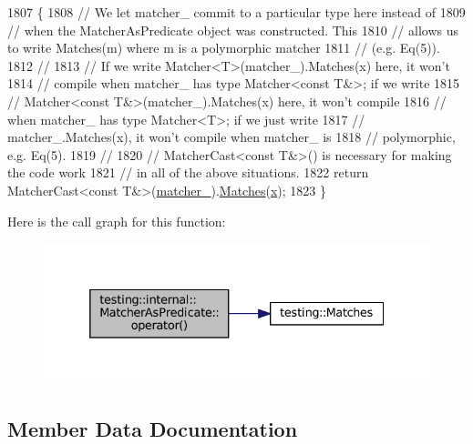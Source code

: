 \begin{DoxyCode}
1807                                     \{
1808     \textcolor{comment}{// We let matcher\_ commit to a particular type here instead of}
1809     \textcolor{comment}{// when the MatcherAsPredicate object was constructed.  This}
1810     \textcolor{comment}{// allows us to write Matches(m) where m is a polymorphic matcher}
1811     \textcolor{comment}{// (e.g. Eq(5)).}
1812     \textcolor{comment}{//}
1813     \textcolor{comment}{// If we write Matcher<T>(matcher\_).Matches(x) here, it won't}
1814     \textcolor{comment}{// compile when matcher\_ has type Matcher<const T&>; if we write}
1815     \textcolor{comment}{// Matcher<const T&>(matcher\_).Matches(x) here, it won't compile}
1816     \textcolor{comment}{// when matcher\_ has type Matcher<T>; if we just write}
1817     \textcolor{comment}{// matcher\_.Matches(x), it won't compile when matcher\_ is}
1818     \textcolor{comment}{// polymorphic, e.g. Eq(5).}
1819     \textcolor{comment}{//}
1820     \textcolor{comment}{// MatcherCast<const T&>() is necessary for making the code work}
1821     \textcolor{comment}{// in all of the above situations.}
1822     \textcolor{keywordflow}{return} MatcherCast<const T&>(\hyperlink{classtesting_1_1internal_1_1MatcherAsPredicate_a29dddc97262852645d39e11c4bb34b58}{matcher\_}).\hyperlink{namespacetesting_ad53b509ae9cd51040d67f668f99702ae}{Matches}(\hyperlink{namespaceinteractive__marker_acda52804aef30b460a72fb21ee01d69d}{x});
1823   \}
\end{DoxyCode}
Here is the call graph for this function\+:
\nopagebreak
\begin{figure}[H]
\begin{center}
\leavevmode
\includegraphics[width=332pt]{classtesting_1_1internal_1_1MatcherAsPredicate_ab4594a16ff5cdfd07acb5017b7aa54f3_cgraph}
\end{center}
\end{figure}


\subsection{Member Data Documentation}
\mbox{\label{classtesting_1_1internal_1_1MatcherAsPredicate_a29dddc97262852645d39e11c4bb34b58}} 

